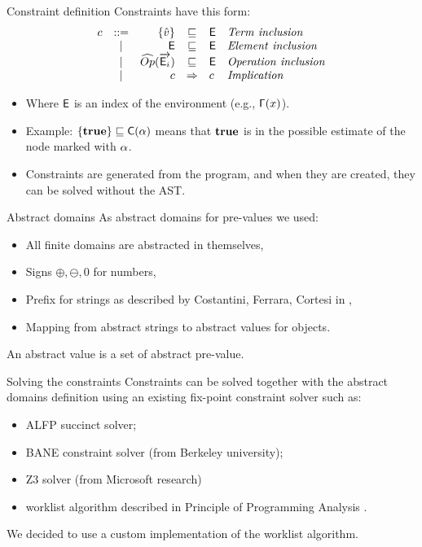 \documentclass[11pt]{beamer}
\begin{document}
\begin{frame}{Constraint definition}
Constraints have this form:
\[
\begin{array}{lcrcll}
c & ::= &\{\vat\} & \sqsubseteq & \El & \mathit{Term\ inclusion}\\
& | & \El & \sqsubseteq & \El & \mathit{Element\ inclusion} \\
& | & \widehat{Op}(\vec{\El_i}) & \sqsubseteq & \El & \mathit{Operation\ inclusion}\\
& | & c & \Rightarrow & c & \mathit{Implication}\\
\end{array}
\]
\begin{itemize}
\item[] Where $\mathsf{E}$ is an index of the environment (e.g., $\mathsf{\Gamma}(x)$).
\item[] Example: $\{\mathbf{true}\}\sqsubseteq \mathsf{C}(\alpha)$ means that $\mathbf{true}$ is in the possible estimate of the node marked with $\alpha$.
\item[] Constraints are generated from the program, and when they are created, they can be solved without the AST.
\end{itemize}
\end{frame}




\begin{frame}{Abstract domains}
As abstract domains for pre-values we used:
\begin{itemize}
\item All finite domains are abstracted in themselves,
\item Signs $\oplus, \ominus, 0$ for numbers,
\item Prefix for strings as described by Costantini, Ferrara, Cortesi in \cite{StringAbstraction},
\item Mapping from abstract strings to abstract values for objects.
\end{itemize}
An abstract value is a set of abstract pre-value.
\end{frame}

\begin{frame}{Solving the constraints}
Constraints can be solved together with the abstract domains definition using an existing fix-point constraint solver such as:
\begin{itemize}
\item ALFP succinct solver\cite{SuccinctSolver};
\item BANE constraint solver (from Berkeley university);
\item Z3 solver (from Microsoft research)
\item worklist algorithm described in Principle of Programming Analysis \cite{PrincipleProgramAnalysis}.
\end{itemize}
We decided to use a custom implementation of the worklist algorithm.
\end{frame}
\end{document}
